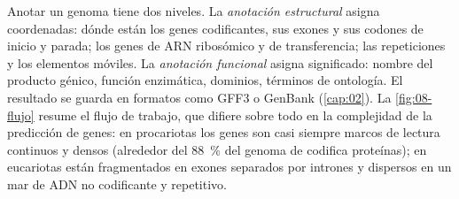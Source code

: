 Anotar un genoma tiene dos niveles. La \emph{anotación estructural} asigna coordenadas: dónde están los genes codificantes, sus exones y sus codones de inicio y parada; los genes de ARN ribosómico y de transferencia; las repeticiones y los elementos móviles. La \emph{anotación funcional} asigna significado: nombre del producto génico, función enzimática, dominios, términos de ontología. El resultado se guarda en formatos como GFF3 o GenBank (\cref{cap:02}). La \cref{fig:08-flujo} resume el flujo de trabajo, que difiere sobre todo en la complejidad de la predicción de genes: en procariotas los genes son casi siempre marcos de lectura continuos y densos (alrededor del \SI{88}{\percent} del genoma de  codifica proteínas); en eucariotas están fragmentados en exones separados por intrones y dispersos en un mar de ADN no codificante y repetitivo.


